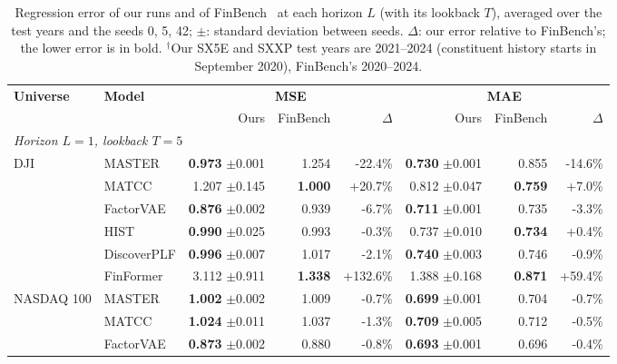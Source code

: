 \begin{table}[tb]
\centering
\caption{Regression error of our runs and of FinBench~\cite{pederzoli2026finbench} at each horizon $L$ (with its lookback $T$), averaged over the test years and the seeds 0, 5, 42; $\pm$: standard deviation between seeds. $\Delta$: our error relative to FinBench's; the lower error is in bold. $^\dagger$Our SX5E and SXXP test years are 2021--2024 (constituent history starts in September 2020), FinBench's 2020--2024.}
\begin{adjustbox}{max width=\textwidth}
{\normalsize
\setlength{\tabcolsep}{6pt}

\begin{tabular}{llrrrrrr}
\toprule
\multirow{2}{*}{\textbf{Universe}} & \multirow{2}{*}{\textbf{Model}} & \multicolumn{3}{c}{\textbf{MSE}} & \multicolumn{3}{c}{\textbf{MAE}} \\
\cmidrule(lr){3-5} \cmidrule(lr){6-8}
 & & Ours & FinBench & $\Delta$ & Ours & FinBench & $\Delta$ \\
\midrule
\multicolumn{8}{l}{\textit{Horizon $L=1$, lookback $T=5$}} \\
\multirow{6}{*}{DJI} & MASTER & \textbf{0.973} {\scriptsize$\pm$0.001} & 1.254 & -22.4\% & \textbf{0.730} {\scriptsize$\pm$0.001} & 0.855 & -14.6\% \\
 & MATCC & 1.207 {\scriptsize$\pm$0.145} & \textbf{1.000} & +20.7\% & 0.812 {\scriptsize$\pm$0.047} & \textbf{0.759} & +7.0\% \\
 & FactorVAE & \textbf{0.876} {\scriptsize$\pm$0.002} & 0.939 & -6.7\% & \textbf{0.711} {\scriptsize$\pm$0.001} & 0.735 & -3.3\% \\
 & HIST & \textbf{0.990} {\scriptsize$\pm$0.025} & 0.993 & -0.3\% & 0.737 {\scriptsize$\pm$0.010} & \textbf{0.734} & +0.4\% \\
 & DiscoverPLF & \textbf{0.996} {\scriptsize$\pm$0.007} & 1.017 & -2.1\% & \textbf{0.740} {\scriptsize$\pm$0.003} & 0.746 & -0.9\% \\
 & FinFormer & 3.112 {\scriptsize$\pm$0.911} & \textbf{1.338} & +132.6\% & 1.388 {\scriptsize$\pm$0.168} & \textbf{0.871} & +59.4\% \\
\midrule
\multirow{6}{*}{NASDAQ 100} & MASTER & \textbf{1.002} {\scriptsize$\pm$0.002} & 1.009 & -0.7\% & \textbf{0.699} {\scriptsize$\pm$0.001} & 0.704 & -0.7\% \\
 & MATCC & \textbf{1.024} {\scriptsize$\pm$0.011} & 1.037 & -1.3\% & \textbf{0.709} {\scriptsize$\pm$0.005} & 0.712 & -0.5\% \\
 & FactorVAE & \textbf{0.873} {\scriptsize$\pm$0.002} & 0.880 & -0.8\% & \textbf{0.693} {\scriptsize$\pm$0.001} & 0.696 & -0.4\% \\

\end{tabular}}
\end{adjustbox}
\end{table}
